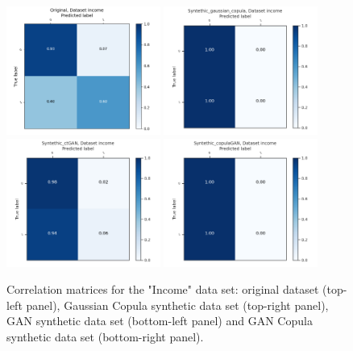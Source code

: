 \documentclass{article}
\begin{document}
\begin{figure}[h!]
	\centering
	\includegraphics[width=0.45\textwidth]{../ConfusionMatrixes/income_Original_.png}
	\includegraphics[width=0.45\textwidth]{../ConfusionMatrixes/income_Syntethic_gaussian_copula_.png}
	\includegraphics[width=0.45\textwidth]{../ConfusionMatrixes/income_Syntethic_ctGAN_.png}
	\includegraphics[width=0.45\textwidth]{../ConfusionMatrixes/income_Syntethic_copulaGAN_.png}
	
	\caption{Correlation matrices for the "Income" data set: original dataset (top-left panel), Gaussian Copula synthetic data set (top-right panel), GAN synthetic data set (bottom-left panel) and GAN Copula synthetic data set (bottom-right panel).  }
	\label{confusion_income}
\end{figure}
\end{document}
